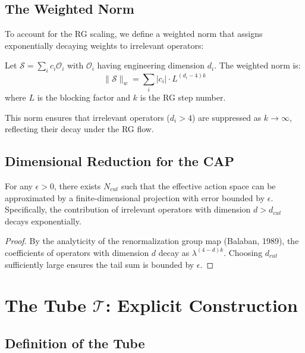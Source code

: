 \subsection{The Weighted Norm}

To account for the RG scaling, we define a weighted norm that assigns exponentially decaying weights to irrelevant operators:

\begin{definition}
Let $\mathcal{S} = \sum_i c_i \mathcal{O}_i$ with $\mathcal{O}_i$ having engineering dimension $d_i$. The weighted norm is:
\begin{equation}
\| \mathcal{S} \|_w = \sum_i |c_i| \cdot L^{(d_i - 4)k}
\end{equation}
where $L$ is the blocking factor and $k$ is the RG step number.
\end{definition}

This norm ensures that irrelevant operators ($ d_i > 4$) are suppressed as $k \to \infty$, reflecting their decay under the RG flow.

\subsection{Dimensional Reduction for the CAP}

\begin{lemma}
\label{lem:finite_dim_approx}
For any $\epsilon > 0$, there exists $N_{cut}$ such that the effective action space can be approximated by a finite-dimensional projection with error bounded by $\epsilon$. Specifically, the contribution of irrelevant operators with dimension $d > d_{cut}$ decays exponentially.
\end{lemma}

\begin{proof}
By the analyticity of the renormalization group map (Balaban, 1989), the coefficients of operators with dimension $d$ decay as $\lambda^{(4-d)k}$. Choosing $d_{cut}$ sufficiently large ensures the tail sum is bounded by $\epsilon$.
\end{proof}

\section{The Tube \texorpdfstring{$\mathcal{T}$}{T}: Explicit Construction}

\subsection{Definition of the Tube}

